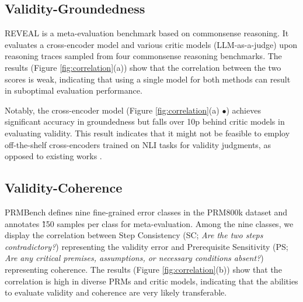 \subsection{Validity-Groundedness}
\label{sec:transfer-vg}

REVEAL \citep{jacovi-etal-2024-chain} is a meta-evaluation benchmark based on commonsense reasoning. It evaluates a cross-encoder model \citep{honovich-etal-2022-true} and various critic models (LLM-as-a-judge) \citep{brown2020languagemodelsfewshotlearners, wei2022finetunedlanguagemodelszeroshot, anil2023palm2technicalreport} upon reasoning traces sampled from four commonsense reasoning benchmarks. The results (Figure \ref{fig:correlation}(a)) show that the correlation between the two scores is weak, indicating that using a single model for both methods can result in suboptimal evaluation performance. 

Notably, the cross-encoder model (Figure \ref{fig:correlation}(a) \textcolor{medorange}{$\bullet$}\color{black}) achieves significant accuracy in groundedness but falls over 10p behind critic models in evaluating validity. This result indicates that it might not be feasible to employ off-the-shelf cross-encoders trained on NLI tasks for validity judgments, as opposed to existing works \citep{DBLP:conf/iclr/GolovnevaCPCZFC23, prasad-etal-2023-receval}.

\subsection{Validity-Coherence}


PRMBench \citep{song2025prmbenchfinegrainedchallengingbenchmark} defines nine fine-grained error classes in the PRM800k dataset \citep{DBLP:conf/iclr/LightmanKBEBLLS24} and annotates \~150 samples per class for meta-evaluation. Among the nine classes, we display the correlation between Step Consistency (SC; \textit{Are the two steps contradictory?}) representing the validity error and Prerequisite Sensitivity (PS; \textit{Are any critical premises, assumptions, or necessary conditions absent?}) representing coherence.
The results (Figure \ref{fig:correlation}(b)) show that the correlation is high in diverse PRMs and critic models, indicating that the abilities to evaluate validity and coherence are very likely transferable.



